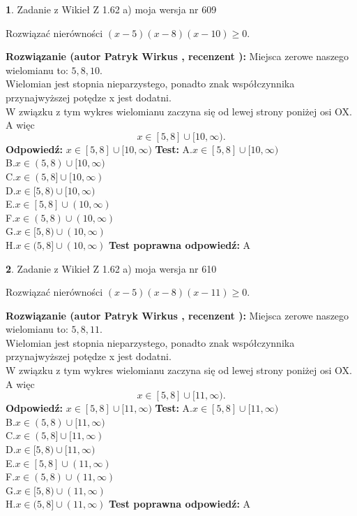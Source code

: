 \documentclass[12pt, a4paper]{article}
\theoremstyle{definition} %
\newtheorem{zad}{}
\newcommand{\zadStart}[1]{\begin{zad}#1\newline}
\newcommand{\zadStop}{\end{zad}}
\newcommand{\rozwStart}[2]{\noindent \textbf{Rozwiązanie (autor #1 , recenzent #2): }\newline}
\newcommand{\rozwStop}{\newline}
\newcommand{\odpStart}{\noindent \textbf{Odpowiedź:}\newline}
\newcommand{\odpStop}{\newline}
\newcommand{\testStart}{\noindent \textbf{Test:}\newline}
\newcommand{\testStop}{\newline}
\newcommand{\kluczStart}{\noindent \textbf{Test poprawna odpowiedź:}\newline}
\newcommand{\kluczStop}{\newline}
\begin{document}
\zadStart{Zadanie z Wikieł Z 1.62 a) moja wersja nr 609}

Rozwiązać nierówności $(x-5)(x-8)(x-10)\ge0$.
\zadStop
\rozwStart{Patryk Wirkus}{}
Miejsca zerowe naszego wielomianu to: $5, 8, 10$.\\
Wielomian jest stopnia nieparzystego, ponadto znak współczynnika przy\linebreak najwyższej potędze x jest dodatni.\\ W związku z tym wykres wielomianu zaczyna się od lewej strony poniżej osi OX. A więc $$x \in [5,8] \cup [10,\infty).$$
\rozwStop
\odpStart
$x \in [5,8] \cup [10,\infty)$
\odpStop
\testStart
A.$x \in [5,8] \cup [10,\infty)$\\
B.$x \in (5,8) \cup [10,\infty)$\\
C.$x \in (5,8] \cup [10,\infty)$\\
D.$x \in [5,8) \cup [10,\infty)$\\
E.$x \in [5,8] \cup (10,\infty)$\\
F.$x \in (5,8) \cup (10,\infty)$\\
G.$x \in [5,8) \cup (10,\infty)$\\
H.$x \in (5,8] \cup (10,\infty)$
\testStop
\kluczStart
A
\kluczStop



\zadStart{Zadanie z Wikieł Z 1.62 a) moja wersja nr 610}

Rozwiązać nierówności $(x-5)(x-8)(x-11)\ge0$.
\zadStop
\rozwStart{Patryk Wirkus}{}
Miejsca zerowe naszego wielomianu to: $5, 8, 11$.\\
Wielomian jest stopnia nieparzystego, ponadto znak współczynnika przy\linebreak najwyższej potędze x jest dodatni.\\ W związku z tym wykres wielomianu zaczyna się od lewej strony poniżej osi OX. A więc $$x \in [5,8] \cup [11,\infty).$$
\rozwStop
\odpStart
$x \in [5,8] \cup [11,\infty)$
\odpStop
\testStart
A.$x \in [5,8] \cup [11,\infty)$\\
B.$x \in (5,8) \cup [11,\infty)$\\
C.$x \in (5,8] \cup [11,\infty)$\\
D.$x \in [5,8) \cup [11,\infty)$\\
E.$x \in [5,8] \cup (11,\infty)$\\
F.$x \in (5,8) \cup (11,\infty)$\\
G.$x \in [5,8) \cup (11,\infty)$\\
H.$x \in (5,8] \cup (11,\infty)$
\testStop
\kluczStart
A
\kluczStop
\end{document}
